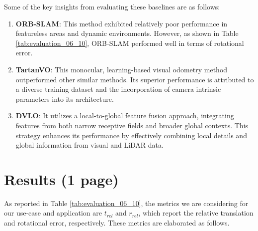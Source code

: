 \documentclass[11pt,a4paper]{article}
\begin{document}
Some of the key insights from evaluating these baselines are as follows:
\begin{enumerate}
  \item \textbf{ORB-SLAM}:  This method exhibited relatively poor performance in featureless areas and dynamic environments. However, as shown in Table \ref{tab:evaluation_06_10}, ORB-SLAM performed well in terms of rotational error.
  \item \textbf{TartanVO}: This monocular, learning-based visual odometry method outperformed other similar methods. Its superior performance is attributed to a diverse training dataset and the incorporation of camera intrinsic parameters into its architecture.
  \item \textbf{DVLO}: It utilizes a local-to-global feature fusion approach, integrating features from both narrow receptive fields and broader global contexts. This strategy enhances its performance by effectively combining local details and global information from visual and LiDAR data.
\end{enumerate}





\section{Results (1 page)}
As reported in Table \ref{tab:evaluation_06_10}, the metrics we are considering for our use-case and application are \textit{$t_{rel}$} and \textit{$r_{rel}$}, which report the relative translation and rotational error, respectively. These metrics are elaborated as follows.
\end{document}

